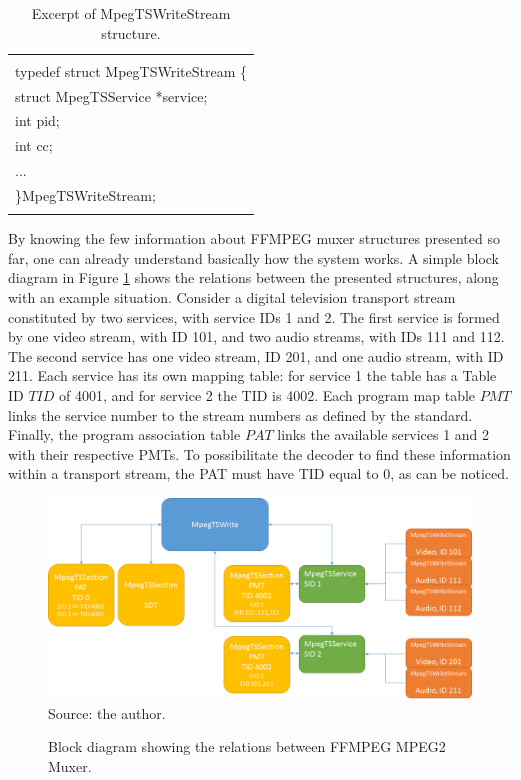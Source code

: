 \documentclass[
	12pt,				%
	openright,			%
	twoside,			%
	a4paper,			%
	brazil,
	french,				%
	english
	]{abntex2}
\begin{document}
\begin{table}[!htpd]
\label{tab_MpegTSWriteStream}
\caption{ Excerpt of MpegTSWriteStream structure.}
\begin{center}
\begin{tabular}{|l|}
\hline
\\
typedef struct MpegTSWriteStream \{\\
struct MpegTSService *service;\\
int pid;\\
int cc;\\
...\\
\}MpegTSWriteStream;\\
 \\
\hline
\end{tabular}
\end{center}
\end{table}

By knowing the few information about FFMPEG muxer structures presented so far, one can already understand basically how the system works. A simple block diagram in Figure \ref{fig:diagrama_estruturas_ffmpeg} shows the relations between the presented structures, along with an example situation. Consider a digital television transport stream constituted by two services, with service IDs 1 and 2. The first service is formed by one video stream, with ID 101, and two audio streams, with IDs 111 and 112. The second service has one video stream, ID 201, and one audio stream, with ID 211. Each service has its own mapping table: for service 1 the table has a Table ID \(TID\) of 4001, and for service 2 the TID is 4002. Each program map table \(PMT\) links the service number to the stream numbers as defined by the standard. Finally, the program association table \(PAT\) links the available services 1 and 2 with their respective PMTs. To possibilitate the decoder to find these information within a transport stream, the PAT must have TID equal to 0, as can be noticed.

\begin{figure}
\centering
\caption{Block diagram showing the relations between FFMPEG MPEG2 Muxer.}
\includegraphics[width=1\linewidth]{figuras/diagrama_estruturas_ffmpeg.png}
\\Source: the author.
\label{fig:diagrama_estruturas_ffmpeg}
\end{figure}
\end{document}
